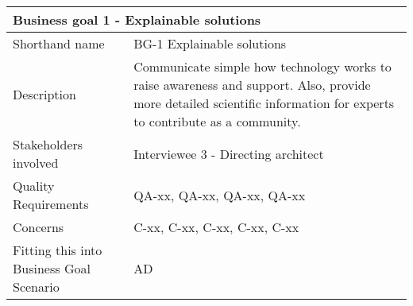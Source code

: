 \begin{tabular}{ |p{3cm}||p{10cm}|}
 \hline
 \multicolumn{2}{|l|}{Business goal 1 - Explainable solutions} \\
 \hline
 Shorthand name   & BG-1 Explainable solutions    \\
 \hline
 Description &   Communicate simple how technology works to raise awareness and support. Also, provide more detailed scientific information for experts to contribute as a community.  \\
  \hline
 Stakeholders involved & Interviewee 3 - Directing architect  \\
  \hline
 Quality Requirements   & QA-xx, QA-xx, QA-xx, QA-xx \\
  \hline
 Concerns &   C-xx, C-xx, C-xx, C-xx, C-xx\\
  \hline
 Fitting this into Business Goal Scenario & AD \\
 \hline
\end{tabular}


